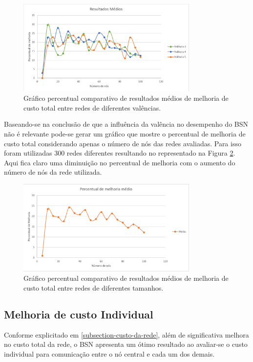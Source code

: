\begin{figure} [ht]%
	\centering
	\includegraphics[width=0.8\textwidth]{./figuras/BSN-resultados-medios.png} %
	\caption[Melhoria de custo x valência]{Gráfico percentual comparativo de resultados médios de melhoria de custo total entre redes de diferentes valências.}
	\label{fig_graph_bsn_medio}
\end{figure}

Baseando-se na conclusão de que a influência da valência no desempenho do BSN não é relevante pode-se gerar um gráfico que mostre o percentual de melhoria de custo total considerando apenas o número de nós das redes avaliadas. Para isso foram utilizadas 300 redes diferentes resultando no representado na Figura \ref{fig_graph_bsn_medio_all}. Aqui fica claro uma diminuição no percentual de melhoria com o aumento do número de nós da rede utilizada. 

\begin{figure} [ht]%
	\centering
	\includegraphics[width=0.8\textwidth]{./figuras/BSN-resultados-medios-all.png} %
	\caption[Melhoria de custo x tamanho de rede]{Gráfico percentual comparativo de resultados médios de melhoria de custo total entre redes de diferentes tamanhos.}
	\label{fig_graph_bsn_medio_all}
\end{figure}

\subsection{Melhoria de custo Individual}
Conforme explicitado em \ref{subsection-custo-da-rede}, além de significativa melhora no custo total da rede, o BSN apresenta um ótimo resultado ao avaliar-se o custo individual para comunicação entre o nó central e cada um dos demais.
